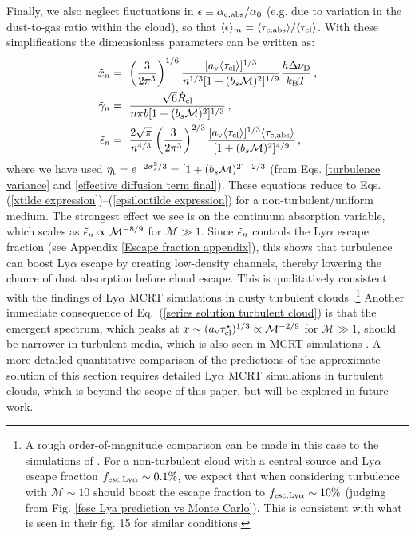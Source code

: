 \documentclass[fleqn,usenatbib]{mnras}
\newcommand{\taucl}{\tau_{\rm cl}}
\begin{document}
Finally, we also neglect fluctuations in $\epsilon \equiv \alpha_{\rm c,abs}/\alpha_0$ (e.g. due to variation in the dust-to-gas ratio within the cloud), so that $\langle \epsilon \rangle_{m} = \langle \tau_{\rm c,abs} \rangle/\langle \taucl \rangle$. With these simplifications the dimensionless parameters can be written as:
\begin{align}
    \Tilde{x}_n &=~  \left( \dfrac{3}{2 \pi^3} \right)^{1/6}  \dfrac{[a_{\rm v} \langle \taucl \rangle]^{1/3}}{n^{1/3} [1 + (b_s \mathcal{M})^2]^{1/9}} \dfrac{h \Delta\nu_{\rm D}}{k_{\rm B} T} \, \label{xtilde expression turb},  \\ \Tilde{\gamma}_n  &=~   \dfrac{\sqrt{6}\Dot{R}_{\rm cl}}{n \pi b [1 + (b_s \mathcal{M})^2]^{1/3}} \, \label{gammatilde expression turb}, \\ \Tilde{\epsilon}_n  &=~  \dfrac{2 \sqrt{\pi}}{n^{4/3} } \left( \dfrac{3}{2 \pi^3} \right)^{2/3}  \dfrac{[a_{\rm v} \langle \taucl \rangle]^{1/3} \langle \tau_{\rm c,abs} \rangle}{[1 + (b_s \mathcal{M})^2]^{4/9}}\, \label{epsilontilde expression turb},
\end{align}
where we have used $\eta_{\rm t} = e^{-2 \sigma_s^2 /3} = [1 + (b_s \mathcal{M})^2]^{-2/3}$ (from Eqs. \ref{turbulence variance} and \ref{effective diffusion term final}). These equations reduce to Eqs.  (\ref{xtilde expression})--(\ref{epsilontilde expression}) for a non-turbulent/uniform medium. The strongest effect we see is on the continuum absorption variable, which scales as $\Tilde{\epsilon}_n \propto \mathcal{M}^{-8/9}$ for $\mathcal{M} \gg 1$. Since $\Tilde{\epsilon}_n$ controls the Ly$\alpha$ escape fraction (see Appendix \ref{Escape fraction appendix}), this shows that turbulence can boost Ly$\alpha$ escape by creating low-density channels, thereby lowering the chance of dust absorption before cloud escape. This is qualitatively consistent with the findings of Ly$\alpha$ MCRT simulations in dusty turbulent clouds \citep{Kimm2019, Kimm2022}.\footnote{A rough order-of-magnitude comparison can be made in this case to the simulations of \cite{Kimm2019}. For a non-turbulent cloud with a central source and Ly$\alpha$ escape fraction $f_{\rm esc, Ly\alpha} \sim 0.1 \%$, we expect that when considering turbulence with $\mathcal{M} \sim 10$ should boost the escape fraction to $f_{\rm esc,Ly\alpha} \sim 10\%$ (judging from Fig. \ref{fesc Lya prediction vs Monte Carlo}). This is consistent with what is seen in their fig. 15 for similar conditions.} Another immediate consequence of Eq.~(\ref{series solution turbulent cloud}) is that the emergent spectrum, which peaks at $x \sim (a_{\rm v} \taucl^{\star})^{1/3} \propto  \mathcal{M}^{-2/9}$ for $\mathcal{M} \gg 1$, should be narrower in turbulent media, which is also seen in MCRT simulations \citep{Kimm2019, Kakiichi2021}. A more detailed quantitative comparison of the predictions of the approximate solution of this section requires detailed Ly$\alpha$ MCRT simulations in turbulent clouds, which is beyond the scope of this paper, but will be explored in future work. 
\end{document}
